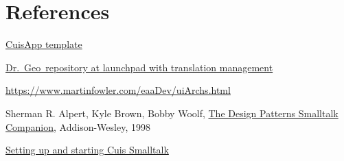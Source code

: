 \documentclass{beamer}
\newcommand{\drgeo}{Dr.~Geo}
\begin{document}
\section{References}
\begin{frame}
  \fontsize{10pt}{8pt}\selectfont
  \begin{thebibliography}{99}

    \href{https://github.com/hilaire/CuisApp}{CuisApp template}

   \href{https://launchpad.net/drgeo}{\drgeo\
      repository at launchpad with translation management}

    \href{GUI Architectures}{https://www.martinfowler.com/eaaDev/uiArchs.html}
    
    Sherman R. Alpert, Kyle Brown, Bobby Woolf,
    \href{https://dl.acm.org/doi/book/10.5555/275616}{The Design
      Patterns Smalltalk Companion}, Addison-Wesley, 1998
    
    \href{https://github.com/Cuis-Smalltalk/Cuis-Smalltalk-Dev/blob/master/Documentation/GettingStarted.md}{Setting
      up and starting Cuis Smalltalk}

  \end{thebibliography}

  
\end{frame}
\end{document}
